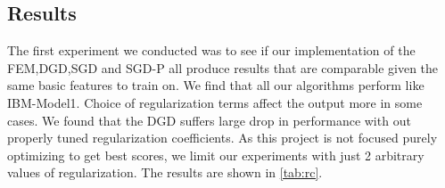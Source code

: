 \documentclass[11pt,letterpaper]{article}
\begin{document}
\subsection{Results}
The first experiment we conducted was to see if our implementation of the FEM,DGD,SGD and SGD-P all produce results that are comparable given the same basic features to train on. We find that all our algorithms perform like IBM-Model1. Choice of regularization terms affect the output more in some cases. We found that the DGD suffers large drop in performance with out properly tuned regularization coefficients. As this project is not focused purely optimizing to get best scores, we limit our experiments with just 2 arbitrary values of regularization. The results are shown in \ref{tab:rc}. 
\begin{table}[h]
\centering
{}
\caption{\label{tab:rc} Comparison of the algorithms trained on 2K sentences and tested on 200, only with base features}
\end{table}
\end{document}
